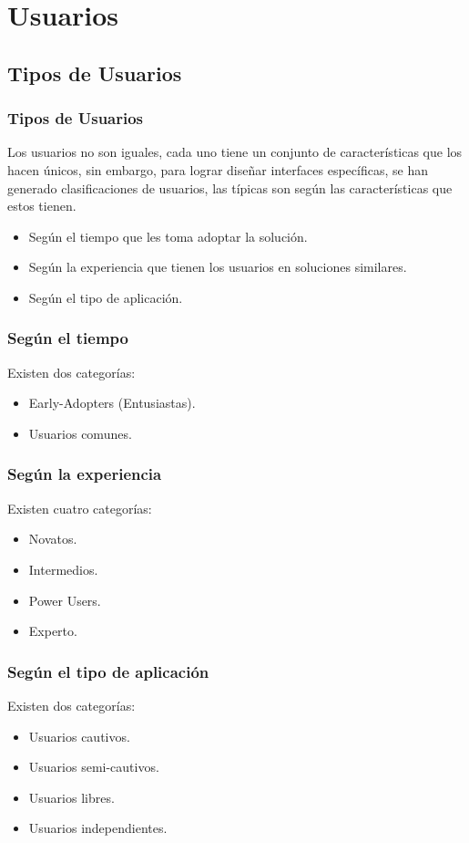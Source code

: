 \documentclass[12pt]{beamer}
\begin{document}
\section{Usuarios}

\subsection{Tipos de Usuarios}

\begin{frame}
 \frametitle{Tipos de Usuarios}
 Los usuarios no son iguales, cada uno tiene un conjunto de características que los hacen únicos, sin embargo, para lograr diseñar interfaces específicas, se han generado clasificaciones de usuarios, las típicas son según las características que estos tienen.
 \begin{itemize}
  \item<2-> Según el \alert{tiempo} que les toma adoptar la solución.
  \item<3-> Según la \alert{experiencia} que tienen los usuarios en soluciones similares.
  \item<4-> Según el \alert{tipo de aplicación}.
 \end{itemize}
\end{frame}


\begin{frame}
 \frametitle{Según el tiempo}
 Existen dos categorías:
 \begin{itemize}
  \item<2-> Early-Adopters (Entusiastas).
  \item<3-> Usuarios comunes.
 \end{itemize}
\end{frame}


\begin{frame}
 \frametitle{Según la experiencia}
 Existen cuatro categorías:
 \begin{itemize}
  \item<2-> Novatos.
  \item<3-> Intermedios.
  \item<4-> Power Users.
  \item<5-> Experto.
 \end{itemize}
\end{frame}


\begin{frame}
 \frametitle{Según el tipo de aplicación}
 Existen dos categorías:
 \begin{itemize}
  \item<2-> Usuarios cautivos.
  \item<3-> Usuarios semi-cautivos.
  \item<4-> Usuarios libres.
  \item<5-> Usuarios independientes.
 \end{itemize}
\end{frame}
\end{document}
